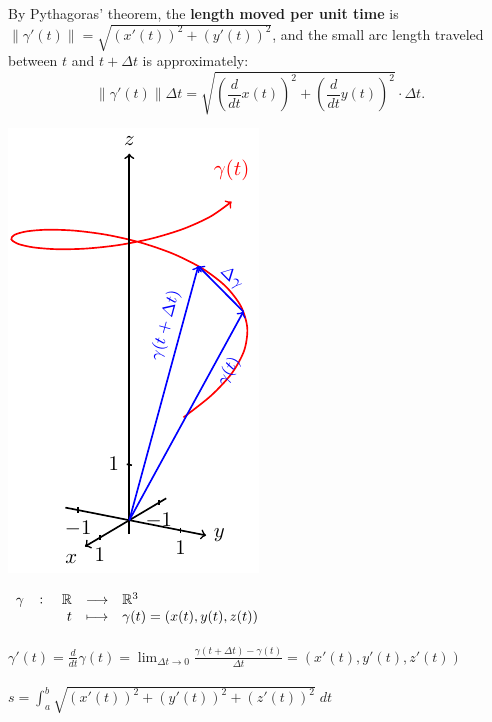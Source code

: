 \documentclass[11pt,openany]{article}
\renewcommand{\emph}[1]{\textbf{#1}}
\begin{document}
By Pythagoras’ theorem, the \emph{length moved per unit time} is \(\|\gamma'(t)\|=\sqrt{(x'(t))^2 + (y'(t))^2}\), and the small arc length traveled between \(t\) and \(t+\Delta t\) is approximately: \[
\|\gamma'(t)\| \Delta t=\sqrt{\left(\frac{d}{dt}x(t)\right)^2+\left(\frac{d}{dt}y(t)\right)^2}\cdot\Delta t.
\]
\newpage
{}
\begin{center}
\begin{minipage}{.4\textwidth}\centering
\includegraphics[scale=1]{../riemann-tikz/curve_in_3d.pdf}
\end{minipage}\hfill
\begin{minipage}{.59\textwidth}
$\fullfunction{\gamma}{\R}{\R^3}{t}{\gamma(t)=(x(t),y(t),z(t))}$\ \\
\vfill\ \\
$\displaystyle\gamma'(t)=\frac{d}{dt}\gamma(t)
= \lim_{\Delta t\to0}
\frac{\gamma(t+\Delta t)-\gamma(t)}{\Delta t}=(x'(t),y'(t),z'(t))$\  \\
\vfill\ \\
$\displaystyle s=\int_a^b\sqrt{\left(x'(t)\right)^2+\left(y'(t)\right)^2+\left(z'(t)\right)^2}\; dt$
\end{minipage}
\end{center}
\begin{figure}[h!]
\end{figure}
\end{document}

